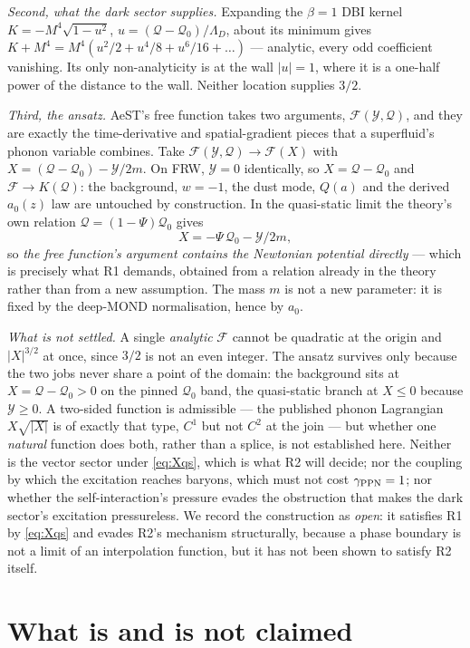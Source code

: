 \documentclass[aps,prd,twocolumn,10pt,nofootinbib,superscriptaddress]{revtex4-2}
\newcommand{\FF}{\mathcal{F}}
\newcommand{\YY}{\mathcal{Y}}
\newcommand{\QQ}{\mathcal{Q}}
\begin{document}
\emph{Second, what the dark sector supplies.} Expanding the $\beta=1$ DBI kernel
$K=-M^4\sqrt{1-u^2}$, $u=(\QQ-\QQ_0)/\Lambda_D$, about its minimum gives
$K+M^4=M^4(u^2/2+u^4/8+u^6/16+\dots)$ --- analytic, every odd coefficient vanishing. Its only
non-analyticity is at the wall $|u|=1$, where it is a one-half power of the distance to the
wall. Neither location supplies $3/2$.

\emph{Third, the ansatz.} AeST's free function takes two arguments, $\FF(\YY,\QQ)$, and they
are exactly the time-derivative and spatial-gradient pieces that a superfluid's phonon variable
combines. Take $\FF(\YY,\QQ)\to\FF(X)$ with $X=(\QQ-\QQ_0)-\YY/2m$. On FRW, $\YY=0$ identically,
so $X=\QQ-\QQ_0$ and $\FF\to K(\QQ)$: the background, $w=-1$, the dust mode, $Q(a)$ and the
derived $a_0(z)$ law are untouched by construction. In the quasi-static limit the theory's own
relation $\QQ=(1-\Psi)\QQ_0$ gives
\begin{equation}
X=-\Psi\,\QQ_0-\YY/2m ,
\label{eq:Xqs}
\end{equation}
so \emph{the free function's argument contains the Newtonian potential directly} --- which is
precisely what R1 demands, obtained from a relation already in the theory rather than from a new
assumption. The mass $m$ is not a new parameter: it is fixed by the deep-MOND normalisation,
hence by $a_0$.

\emph{What is not settled.} A single \emph{analytic} $\FF$ cannot be quadratic at the origin and
$|X|^{3/2}$ at once, since $3/2$ is not an even integer. The ansatz survives only because the
two jobs never share a point of the domain: the background sits at $X=\QQ-\QQ_0>0$ on the pinned
$\QQ_0$ band, the quasi-static branch at $X\le0$ because $\YY\ge0$. A two-sided function is
admissible --- the published phonon Lagrangian $X\sqrt{|X|}$ is of exactly that type, $C^1$ but
not $C^2$ at the join --- but whether one \emph{natural} function does both, rather than a
splice, is not established here. Neither is the vector sector under \eqref{eq:Xqs}, which is
what R2 will decide; nor the coupling by which the excitation reaches baryons, which must not
cost $\gamma_{\rm PPN}=1$; nor whether the self-interaction's pressure evades the obstruction
that makes the dark sector's excitation pressureless. We record the construction as \emph{open}:
it satisfies R1 by \eqref{eq:Xqs} and evades R2's mechanism structurally, because a phase
boundary is not a limit of an interpolation function, but it has not been shown to satisfy R2
itself.

\section{What is and is not claimed}
\end{document}
